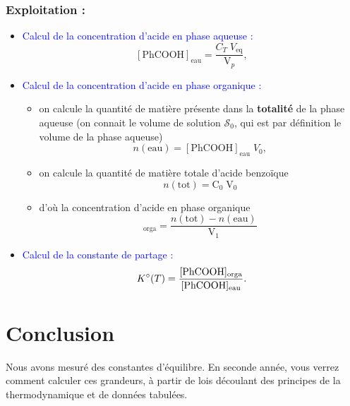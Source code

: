 \documentclass[11pt,a4paper]{report}
\begin{document}
\subsubsection*{Exploitation :}
\begin{itemize}
	\item \textcolor{blue}{Calcul de la concentration d'acide en phase aqueuse :}
	\begin{equation}
		\boxed{[\text{PhCOOH}]_\text{eau} = \frac{C_T\;V_\text{eq}}{\text{V}_p}},
	\end{equation}
		
	\item \textcolor{blue}{Calcul de la concentration d'acide en phase organique : }
		\begin{itemize}
			\item on calcule la quantité de matière présente dans la \textbf{totalité} de la phase 						aqueuse (on connait le volume de solution $\mathcal{S}_0$, qui est par définition le 				volume de la phase aqueuse)
				\begin{equation}
					n(\text{eau}) = [\text{PhCOOH}]_\text{eau}\;V_0,
				\end{equation}
			\item on calcule la quantité de matière totale d'acide benzoïque
				\begin{equation}
					n(\text{tot}) = \text{C}_0\;\text{V}_0
				\end{equation}
			\item d'où la concentration d'acide en phase organique
				\begin{equation}
					[\text{PhCOOH}]_\text{orga} = \frac{n(\text{tot}) - n(\text{eau})}{\text{V}_1}
				\end{equation}								  
		\end{itemize}
	\item \textcolor{blue}{Calcul de la constante de partage :}
		\begin{equation}
			K\degree (T) = \frac{[\text{PhCOOH}]_\text{orga}}{[\text{PhCOOH}]_\text{eau}}.
		\end{equation}
\end{itemize}


\newpage
\section*{Conclusion}

Nous avons mesuré des constantes d'équilibre. En seconde année, vous verrez comment calculer ces grandeurs, à partir de lois découlant des principes de la thermodynamique et de données tabulées.
\end{document}
